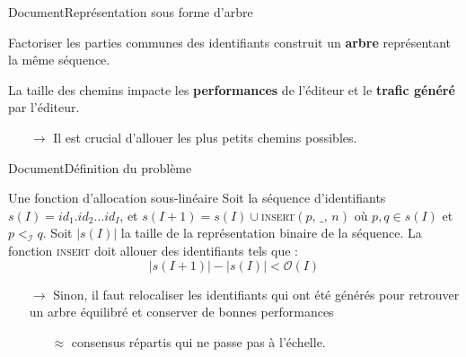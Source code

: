 \begin{frame}{Document}{Représentation sous forme d'arbre}

  \begin{center}
    
  \end{center}
  
  \vspace{0.15cm}
  
  \begin{minipage}{0.55\textwidth}
    Factoriser les parties communes des identifiants construit un \textbf{arbre}
    représentant la même séquence.

    \vspace{0.2cm}

    La taille des chemins impacte les \textbf{performances} de l'éditeur et le
    \textbf{trafic généré} par l'éditeur.
    \begin{itemize}
    \item [$\rightarrow$] Il est crucial d'allouer les plus petits chemins
      possibles.
    \end{itemize}
  \end{minipage}
  \hfill
  \begin{minipage}{0.37\textwidth}
    \begin{center}
      
    \end{center}
  \end{minipage}

\end{frame}



\begin{frame}{Document}{Définition du problème}

  \begin{block}{Une fonction d'allocation sous-linéaire}
    Soit la séquence d'identifiants $s(I)= id_1.id_2\ldots id_I$, et
    $s(I+1) = s(I) \cup $\textsc{insert}$(p,\, \_,\, n)$ où $p,q \in s(I)$ et
    $p<_\mathcal{I}q$. Soit $|s(I)|$ la taille de la représentation binaire de la
    séquence. La fonction \textsc{insert} doit allouer des identifiants tels que :
    \begin{equation}
      |s(I+1)| - |s(I)| < \mathcal{O}(I)
    \end{equation}
  \end{block}
  
  \vspace{0.5cm}

  \begin{itemize}
  \item [$\rightarrow$] Sinon, il faut relocaliser les identifiants qui ont été
    générés pour retrouver un arbre équilibré et conserver de bonnes performances
    \begin{itemize}
    \item [$\approx$] consensus répartis qui ne passe pas à l'échelle.
    \end{itemize}
  \end{itemize}

\end{frame}



